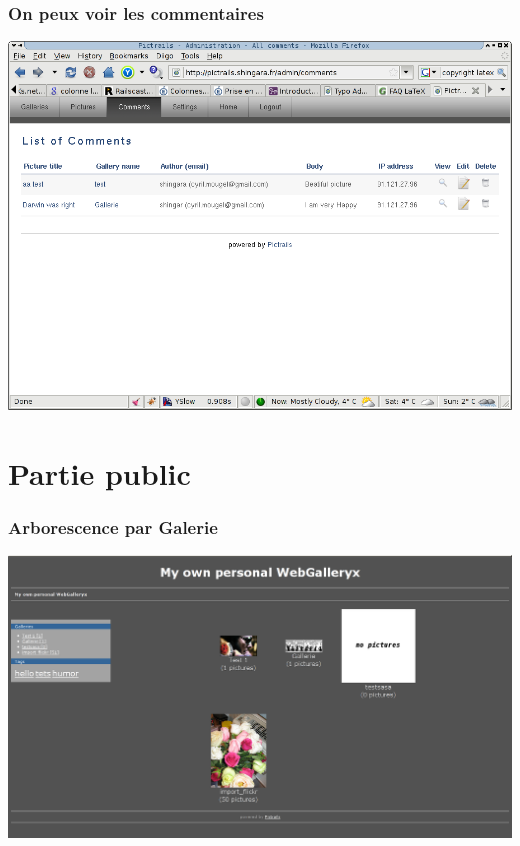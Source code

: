 \documentclass{beamer}
\begin{document}
\begin{frame}
    \frametitle{On peux voir les commentaires}
    \begin{center}
    \includegraphics[scale=.4]{see_comment.png}
    \end{center}
\end{frame}

\section{Partie public}
\begin{frame}
\end{frame}

\begin{frame}
  \frametitle{Arborescence par Galerie}
    \begin{center}
    \includegraphics[scale=.4]{arborescence_gallerie.png}
    \end{center}
\end{frame}
\end{document}
